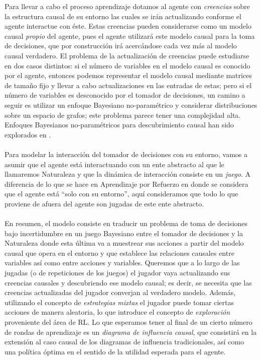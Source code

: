 \documentclass[11pt]{article}
\theoremstyle{plain}
\begin{document}
\indent Para llevar a cabo el proceso aprendizaje dotamos al agente con  \textit{creencias} sobre la estructura causal de su entorno las cuales se irán actualizando conforme el agente interactue con éste. Estas creencias pueden considerarse como un modelo causal \textit{propio} del agente, pues el agente utilizará este modelo causal para la toma de decisiones, que por construcción irá acercándose cada vez más al modelo causal verdadero. El problema de la actualización de creencias puede estudiarse en dos casos distintos: si el número de variables en el modelo causal es conocido por el agente, entonces podemos representar el modelo causal mediante matrices de tamaño fijo y llevar a cabo actualizaciones en las entradas de estas; pero si el número de variables es desconocido por el tomador de decisiones, un camino a seguir es utilizar un enfoque Bayesiano no-paramétrico y considerar distribuciones sobre un espacio de grafos; este problema parece tener una complejidad alta. Enfoques Bayesianos no-paramétricos para descubrimiento causal han sido explorados en \cite{karabatsos2012bayesian}.\\
\\
\indent Para modelar la interacción del tomador de decisiones con su entorno, vamos a asumir que el agente está interactuando con un ente abstracto al que le llamaremos Naturaleza y que la dinámica de interacción consiste en un \textit{juego}. A diferencia de lo que se hace en Aprendizaje por Refuerzo en donde se considera que el agente está “solo con su entorno”, aquí consideramos que todo lo que proviene de afuera del agente son jugadas de este ente abstracto.\\
\\
\indent En resumen, el modelo consiste en traducir un problema de toma de decisiones bajo incertidumbre en un juego Bayesiano entre el tomador de decisiones y la Naturaleza donde esta última va a muestrear sus acciones a partir del modelo causal que opera en el entorno y que establece las relaciones causales entre variables así como entre acciones y variables. Queremos que a lo largo de las jugadas (o de repeticiones de los juegos) el jugador vaya actualizando sus creencias causales y descubriendo ese modelo causal; es decir, se necesita que las creencias actualizadas del jugador converjan al verdadero modelo. Además, utilizando el concepto de \textit{estrategias mixtas} el jugador puede tomar ciertas acciones de manera aleatoria, lo que introduce el concepto de \textit{exploración} proveniente del área de RL. Lo que esperamos tener al final de un cierto número de rondas de aprendizaje es un \textit{diagrama de influencia causal}, que consistirá en la extensión al caso causal de los diagramas de influencia tradicionales, así como una política óptima en el sentido de la utilidad esperada para el agente.\\
\end{document}
